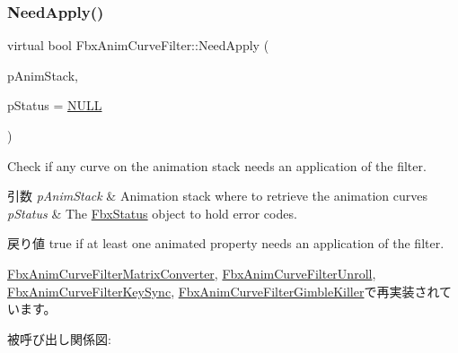 \subsubsection{\texorpdfstring{Need\+Apply()}{NeedApply()}\hspace{0.1cm}{\footnotesize\ttfamily [1/5]}}
{\footnotesize\ttfamily virtual bool Fbx\+Anim\+Curve\+Filter\+::\+Need\+Apply (\begin{DoxyParamCaption}\item[{\hyperlink{class_fbx_anim_stack}{Fbx\+Anim\+Stack} $\ast$}]{p\+Anim\+Stack,  }\item[{\hyperlink{class_fbx_status}{Fbx\+Status} $\ast$}]{p\+Status = {\ttfamily \hyperlink{fbxarch_8h_a070d2ce7b6bb7e5c05602aa8c308d0c4}{N\+U\+LL}} }\end{DoxyParamCaption})\hspace{0.3cm}{\ttfamily [virtual]}}

Check if any curve on the animation stack needs an application of the filter. 
\begin{DoxyParams}{引数}
{\em p\+Anim\+Stack} & Animation stack where to retrieve the animation curves \\
\hline
{\em p\+Status} & The \hyperlink{class_fbx_status}{Fbx\+Status} object to hold error codes. \\
\hline
\end{DoxyParams}
\begin{DoxyReturn}{戻り値}
{\ttfamily true} if at least one animated property needs an application of the filter. 
\end{DoxyReturn}


\hyperlink{class_fbx_anim_curve_filter_matrix_converter_ad19ed98d377e10fb85c20454dbbadaae}{Fbx\+Anim\+Curve\+Filter\+Matrix\+Converter}, \hyperlink{class_fbx_anim_curve_filter_unroll_a8380c6817fbf19d347b0bd0b5ae9a57b}{Fbx\+Anim\+Curve\+Filter\+Unroll}, \hyperlink{class_fbx_anim_curve_filter_key_sync_a987ccf74bf3bdf7828812067d895950c}{Fbx\+Anim\+Curve\+Filter\+Key\+Sync}, \hyperlink{class_fbx_anim_curve_filter_gimble_killer_a3b303b3383e638e445e0bd17570be9ea}{Fbx\+Anim\+Curve\+Filter\+Gimble\+Killer}で再実装されています。

被呼び出し関係図\+:
\mbox{\label{class_fbx_anim_curve_filter_a09438dd8d0e9bcb934e6a4b6fc51bcd7}} 
